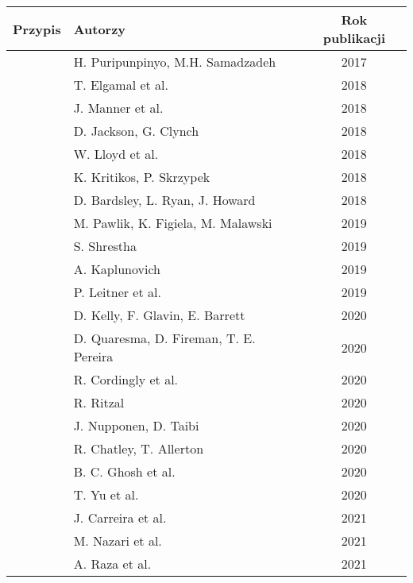 \begin{table}[!ht]
    \centering
    \begin{tabular}{|c|l|c|}
    \hline
    \textbf{Przypis} & \textbf{Autorzy} & \textbf{Rok publikacji} \\
    \hline
    \cite{8116416} & H. Puripunpinyo, M.H. Samadzadeh & 2017 \\
    \hline
    \cite{8567674} & T. Elgamal et al. & 2018 \\
    \hline
    \cite{8605777} & J. Manner et al. & 2018 \\
    \hline
    \cite{8605773} & D. Jackson, G. Clynch & 2018 \\
    \hline
    \cite{8605779} & W. Lloyd et al. & 2018 \\
    \hline
    \cite{8605774} & K. Kritikos, P. Skrzypek & 2018 \\
    \hline
    \cite{8513710} & D. Bardsley, L. Ryan, J. Howard & 2018 \\
    \hline
    \cite{pawlik2019performanceconsiderationsexecutionlarge} & M. Pawlik, K. Figiela, M. Malawski & 2019 \\
    \hline
    \cite{shrestha2019lambda} & S. Shrestha & 2019 \\
    \hline
    \cite{8844428} & A. Kaplunovich & 2019 \\
    \hline
    \cite{LEITNER2019340} & P. Leitner et al. & 2019 \\
    \hline
    \cite{9284261} & D. Kelly, F. Glavin, E. Barrett & 2020 \\
    \hline
    \cite{9235063} & D. Quaresma, D. Fireman, T. E. Pereira & 2020 \\
    \hline
    \cite{Cordingly2020704} & R. Cordingly et al. & 2020 \\
    \hline
    \cite{ritzal2020optimizing} & R. Ritzal & 2020 \\
    \hline
    \cite{9095731} & J. Nupponen, D. Taibi & 2020 \\
    \hline
    \cite{10.1145/3377812.3382135} & R. Chatley, T. Allerton & 2020 \\
    \hline
    \cite{9027427} & B. C. Ghosh et al. & 2020 \\
    \hline
    \cite{10.1145/3419111.3421280} & T. Yu et al. & 2020 \\
    \hline
    \cite{10.1145/3458336.3465305} & J. Carreira et al. & 2021 \\
    \hline
    \cite{9732138} & M. Nazari et al. & 2021 \\
    \hline
    \cite{raza2021sok} & A. Raza et al. & 2021 \\

\end{tabular}
\end{table}
